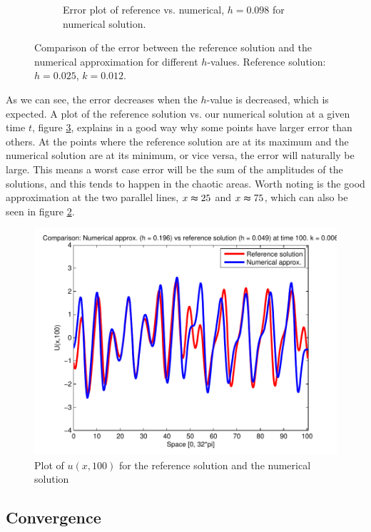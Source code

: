 \begin{figure}[H]
\begin{subfigure}[b]{0.52\textwidth}
                \caption{Error plot of reference vs. numerical, $h = 0.098$ for numerical solution.}
                \label{fig:lowError}
        \end{subfigure}
        \caption{Comparison of the error between the reference solution and the numerical approximation for different $h$-values. Reference solution: $h = 0.025$, $k = 0.012$.}\label{fig:errPlots}
\end{figure}

As we can see, the error decreases when the $h$-value is decreased, which is expected. A plot of the reference solution vs. our numerical solution at a given time $t$, figure \ref{fig:errTime}, explains in a good way why some points have larger error than others. At the points where the reference solution are at its maximum and the numerical solution are at its minimum, or vice versa, the error will naturally be large. This means a worst case error will be the sum of the amplitudes of the solutions, and this tends to happen in the chaotic areas. Worth noting is the good approximation at the two parallel lines, $x \thickapprox 25$ and $x \thickapprox 75$, which can also be seen in figure \ref{fig:errPlots}. 

\begin{figure}[H]
\centering
\includegraphics[scale=0.55]
{../PDFs/IMEX/comp_num_ref_t100.pdf}
\caption{Plot of $u(x,100)$ for the reference solution and the numerical solution}
\label{fig:errTime}
\end{figure}

\subsection{Convergence}
